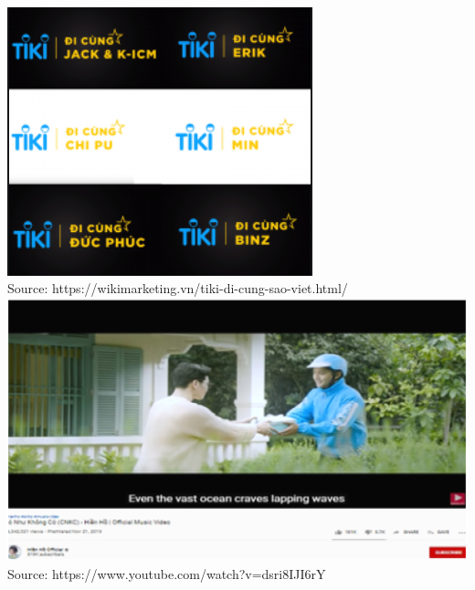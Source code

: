 \documentclass[13pt,a4paper]{article}
\begin{document}
    \\\begin{center}
    \includegraphics[scale=0.8]{images/tiki.png} \\
    \fontsize{10pt}{1.2pt}\selectfont
    Source: https://wikimarketing.vn/tiki-di-cung-sao-viet.html/
    \includegraphics[scale=0.7]{images/conhungkhongco.png} \\
    \fontsize{10pt}{1.2pt}\selectfont
    Source: https://www.youtube.com/watch?v=dsri8IJI6rY
    \end{center}
\end{document}
